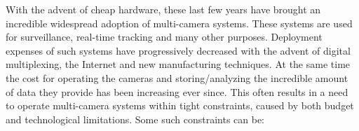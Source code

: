 
With the advent of cheap hardware, these last few years have brought an incredible widespread
adoption of multi-camera systems. These systems are used for surveillance, real-time tracking and
many other purposes. Deployment expenses of such systems have progressively decreased with the
advent of digital multiplexing, the Internet and new manufacturing techniques. At the same time the
cost for operating the cameras and storing/analyzing the incredible amount of data they provide has
been increasing ever since. This often results in a need to operate multi-camera systems within
tight constraints, caused by both budget and technological limitations. Some such constraints can
be:



